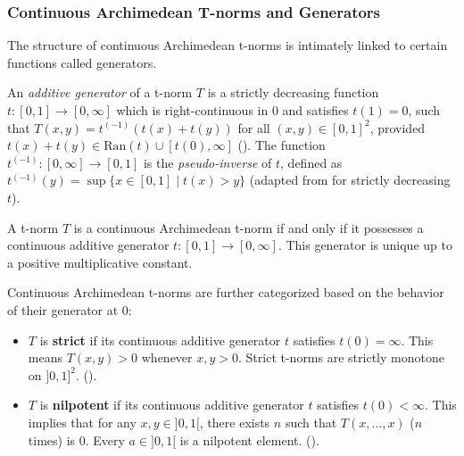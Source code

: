 \subsubsection{Continuous Archimedean T-norms and Generators}
The structure of continuous Archimedean t-norms is intimately linked to certain functions called generators.
\begin{definition}
  An \emph{additive generator} of a t-norm $T$ is a strictly decreasing function $t: [0,1] \to [0,\infty]$ which is right-continuous in $0$ and satisfies $t(1)=0$, such that $T(x,y) = t^{(-1)}(t(x) + t(y))$ for all $(x,y) \in [0,1]^2$, provided $t(x)+t(y) \in \mathrm{Ran}(t) \cup [t(0),\infty]$ (\cite[Def.~3.25, p.~70]{Klement2000}).
  The function $t^{(-1)}: [0,\infty] \to [0,1]$ is the \emph{pseudo-inverse} of $t$, defined as $t^{(-1)}(y) = \sup \{ x \in [0,1] \mid t(x) > y \}$ (adapted from \cite[Def.~3.2, p.~68 and Cor.~3.3]{Klement2000} for strictly decreasing $t$). 
\end{definition}

\begin{theorem}
  A t-norm $T$ is a continuous Archimedean t-norm if and only if it possesses a continuous additive generator $t: [0,1] \to [0,\infty]$. This generator is unique up to a positive multiplicative constant.
\end{theorem}
Continuous Archimedean t-norms are further categorized based on the behavior of their generator at $0$:
\begin{itemize}
    \item $T$ is \textbf{strict} if its continuous additive generator $t$ satisfies $t(0)=\infty$. This means $T(x,y)>0$ whenever $x,y > 0$. Strict t-norms are strictly monotone on $]0,1]^2$. (\cite[Cor.~3.30(i), p.~88; Def.~2.13(i), p.~42]{Klement2000}).
    \item $T$ is \textbf{nilpotent} if its continuous additive generator $t$ satisfies $t(0)<\infty$. This implies that for any $x,y \in ]0,1[$, there exists $n$ such that $T(x, \dots, x)$ ($n$ times) is $0$. Every $a \in ]0,1[$ is a nilpotent element. (\cite[Cor.~3.30(ii), p.~88; Def.~2.13(ii), p.~42]{Klement2000}).
\end{itemize}

